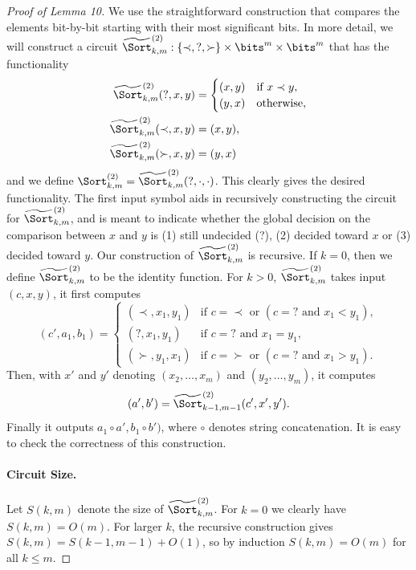 \begin{proof}[Proof of Lemma 10]
We use the straightforward construction that compares the elements bit-by-bit starting with their most significant bits. In more detail, we will construct a circuit $\widetilde{\Sort}^{(2)}_{k,m}:\{\prec,?,\succ\}\times\bits^m\times\bits^m$ that has the functionality
\begin{align*}
\widetilde{\Sort}^{(2)}_{k,m}(?,x,y)&=\begin{cases}(x,y)&\text{if }x\prec y,\\(y,x)&\text{otherwise},\end{cases}\\
\widetilde{\Sort}^{(2)}_{k,m}(\prec,x,y)&=(x,y),\\
\widetilde{\Sort}^{(2)}_{k,m}(\succ,x,y)&=(y,x)
\end{align*}
and we define $\Sort^{(2)}_{k,m}=\widetilde{\Sort}^{(2)}_{k,m}(?,\cdot,\cdot)$. This clearly gives the desired functionality. The first input symbol aids in recursively constructing the circuit for $\widetilde{\Sort}^{(2)}_{k,m}$, and is meant to indicate whether the global decision on the comparison between $x$ and $y$ is (1) still undecided (?), (2) decided toward $x$ or (3) decided toward $y$.
Our construction of $\widetilde{\Sort}^{(2)}_{k,m}$ is recursive. If $k=0$, then we define $\widetilde{\Sort}^{(2)}_{k,m}$ to be the identity function. For $k>0$, $\widetilde{\Sort}^{(2)}_{k,m}$ takes input $(c,x,y)$, it first computes
\[(c',a_1,b_1)=\begin{cases}(\prec,x_1,y_1)&\text{if }c=\prec\text{ or }(c=?\text{ and }x_1<y_1),\\(?,x_1,y_1)&\text{if }c=?\text{ and }x_1=y_1,\\(\succ,y_1,x_1)&\text{if }c=\succ\text{ or }(c=?\text{ and }x_1>y_1).\end{cases}\]
Then, with $x'$ and $y'$ denoting $(x_2,\ldots,x_m)$ and $(y_2,\ldots,y_m)$, it computes
\[(a',b')=\widetilde{\Sort}^{(2)}_{k-1,m-1}(c',x',y').\]
Finally it outputs $a_1\circ a',b_1\circ b')$, where $\circ$ denotes string concatenation. It is easy to check the correctness of this construction.
\paragraph{Circuit Size.} Let $S(k,m)$ denote the size of $\widetilde{\Sort}^{(2)}_{k,m}$. For $k=0$ we clearly have $S(k,m)=O(m)$. For larger $k$, the recursive construction gives $S(k,m)=S(k-1,m-1)+O(1)$, so by induction $S(k,m)=O(m)$ for all $k\le m$.

\end{proof}

